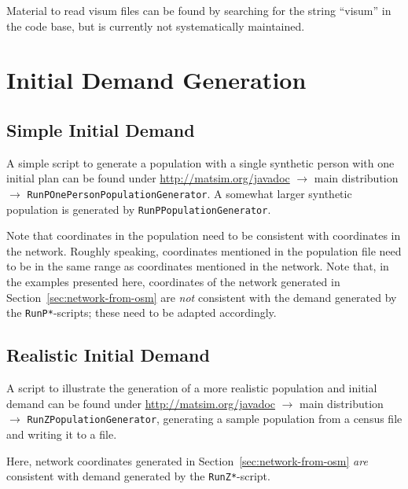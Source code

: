 Material to read \gls{visum} files can be found by searching for the string ``visum'' in the code base, but is currently not systematically maintained.



\section{Initial Demand Generation}
\label{sec:extending-initial-demand}

\subsection{Simple Initial Demand}

A simple script to generate a population with a single synthetic person with one initial plan can be found under \url{http://matsim.org/javadoc} $\to$ main distribution $\to$ \lstinline{RunPOnePersonPopulationGenerator}.  A somewhat larger synthetic population is generated by \lstinline{RunPPopulationGenerator}.

Note that coordinates in the population need to be consistent with coordinates in the network.  Roughly speaking, coordinates mentioned in the population file need to be in the same range as coordinates mentioned in the network.  Note that, in the examples presented here, coordinates of the network generated in Section~\ref{sec:network-from-osm} are \emph{not} consistent with the demand generated by the \lstinline{RunP*}-scripts; these need to be adapted accordingly.

\subsection{Realistic Initial Demand}

A script to illustrate the generation of a more realistic population and initial demand can be found under \url{http://matsim.org/javadoc} $\to$ main distribution $\to$ \lstinline{RunZPopulationGenerator}, generating a sample population from a census file and writing it to a file.

Here, network coordinates generated in Section~\ref{sec:network-from-osm} \emph{are} consistent with demand generated by the \lstinline{RunZ*}-script.




